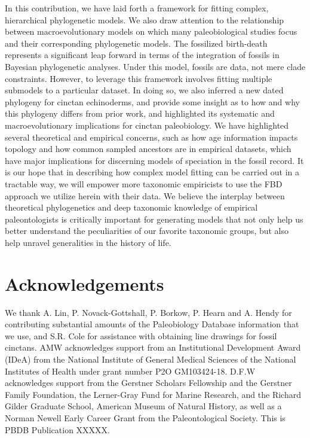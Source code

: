 \documentclass{article}
\begin{document}
In this contribution, we have laid forth a framework for fitting complex, hierarchical phylogenetic models. We also draw attention to the relationship between macroevolutionary models on which many paleobiological studies focus and their corresponding phylogenetic models. 
The fossilized birth-death represents a significant leap forward in terms of the integration of fossils in Bayesian phylogenetic analyses. 
Under this model, fossils are data, not mere clade constraints.
However, to leverage this framework involves fitting multiple submodels to a particular dataset.
In doing so, we also inferred a new dated phylogeny for cinctan echinoderms, and provide some insight as to how and why this phylogeny differs from prior work, and highlighted its systematic and macroevolutionary implications for cinctan paleobiology.
We have highlighted several theoretical and empirical concerns, such as how age information impacts topology and how common sampled ancestors are in empirical datasets, which have major implications for discerning models of speciation in the fossil record.
It is our hope that in describing how complex model fitting can be carried out in a tractable way, we will empower more taxonomic empiricists to use the FBD approach we utilize herein with their data.
We believe the interplay between theoretical phylogenetics and deep taxonomic knowledge of empirical paleontologists is critically important for generating models that not only help us better understand the peculiarities of our favorite taxonomic groups, but also help unravel generalities in the history of life.


\section{Acknowledgements}
We thank A. Lin, P. Novack-Gottshall, P. Borkow, P. Hearn and A. Hendy for contributing substantial amounts of the Paleobiology Database information that we use, and S.R. Cole for assistance with obtaining line drawings for fossil cinctans. AMW acknowledges  support from an Institutional Development Award (IDeA) from the National Institute of General Medical Sciences of the National Institutes of Health under grant number P2O GM103424-18. D.F.W acknowledges support from the Gerstner Scholars Fellowship and the Gerstner Family Foundation, the Lerner-Gray Fund for Marine Research, and the Richard Gilder Graduate School, American Museum of Natural History, as well as a Norman Newell Early Career Grant from the Paleontological Society.  This is PBDB Publication  XXXXX.
\end{document}
